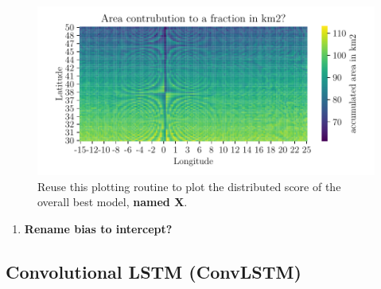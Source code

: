 \begin{figure}
    \centering
    \includegraphics{python_figs/signal_area_pixel.pdf}
    \caption{Reuse this plotting routine to plot the distributed score of the overall best model, \textbf{named X}.}
    \label{fig:grid_mse_best_model}
\end{figure}

\begin{enumerate}
    \item \textbf{Rename bias to intercept?}
\end{enumerate}

\begin{table}[hp]
    \centering
    \caption{Add the weights of the best model.}
    \label{tab:weights_best_model}
\end{table}

\subsection{Convolutional LSTM (ConvLSTM)}

